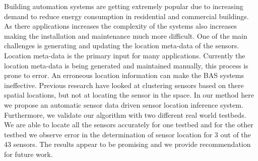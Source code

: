 Building automation systems are getting extremely popular due to increasing demand to reduce energy consumption in residential and commercial  buildings. 
As there applications increases the complexity of the systems also increases making the installation and maintenance much more difficult. One of the main challenges is generating and updating the location meta-data of the sensors. Location meta-data is the primary input for many applications. Currently the location meta-data is being generated and maintained manually, this process is prone to error. An erroneous location information can make the BAS systems ineffective. Previous research have looked at clustering sensors based on there spatial locations, but not at locating the sensor in the space. In our method here we propose an automatic sensor data driven sensor location inference system. Furthermore, we validate our algorithm with two different real world testbeds. We are able to locate all the sensors accurately for one testbed and for the other testbed we observe error in the determination of sensor location for 3 out of the 43 sensors. The results appear to be promising and we provide recommendation for future work.
